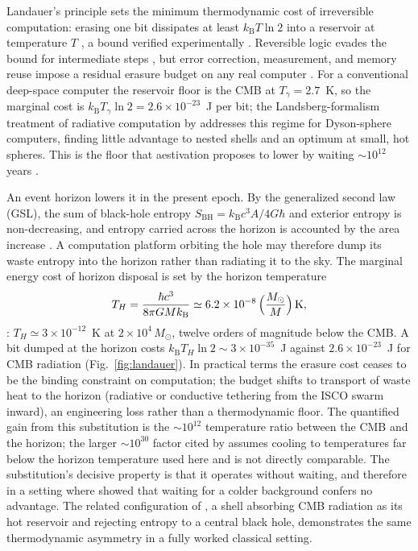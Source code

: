\documentclass[11pt]{article}
\newcommand{\msun}{\ensuremath{M_\odot}}
\newcommand{\kb}{\ensuremath{k_{\mathrm{B}}}}
\begin{document}
Landauer's principle sets the minimum thermodynamic cost of irreversible computation: erasing one bit dissipates at least $\kb T\ln 2$ into a reservoir at temperature $T$ \citep{Landauer1961,Bennett1982,Parrondo2015}, a bound verified experimentally \citep{Berut2012}. Reversible logic evades the bound for intermediate steps \citep{Bennett1973,Toffoli1980,FredkinToffoli1982,Frank2002,Athas1994}, but error correction, measurement, and memory reuse impose a residual erasure budget on any real computer \citep{Wolpert2019}. For a conventional deep-space computer the reservoir floor is the CMB at $T_{\gamma} = 2.7$~K, so the marginal cost is $\kb T_{\gamma}\ln 2 = 2.6\times10^{-23}$~J per bit; the Landsberg-formalism treatment of radiative computation by \citet{Wright2023Landsberg} addresses this regime for Dyson-sphere computers, finding little advantage to nested shells and an optimum at small, hot spheres. This is the floor that aestivation proposes to lower by waiting $\sim$$10^{12}$ years \citep{Sandberg2016}.

An event horizon lowers it in the present epoch. By the generalized second law (GSL), the sum of black-hole entropy $S_{\mathrm{BH}} = \kb c^{3}A/4G\hbar$ and exterior entropy is non-decreasing, and entropy carried across the horizon is accounted by the area increase \citep{Bekenstein1973,Bekenstein1974,Bousso2002}. A computation platform orbiting the hole may therefore dump its waste entropy into the horizon rather than radiating it to the sky. The marginal energy cost of horizon disposal is set by the horizon temperature
\begin{equation}
T_{H} = \frac{\hbar c^{3}}{8\pi G M \kb} \simeq 6.2\times10^{-8}\,\Bigl(\frac{\msun}{M}\Bigr)\,\mathrm{K},
\label{eq:hawking}
\end{equation}
\citep{Hawking1974,Hawking1975}: $T_H \simeq 3\times10^{-12}$~K at $2\times10^{4}\,\msun$, twelve orders of magnitude below the CMB. A bit dumped at the horizon costs $\kb T_H \ln 2 \sim 3\times10^{-35}$~J against $2.6\times10^{-23}$~J for CMB radiation (Fig.~\ref{fig:landauer}). In practical terms the erasure cost ceases to be the binding constraint on computation; the budget shifts to transport of waste heat to the horizon (radiative or conductive tethering from the ISCO swarm inward), an engineering loss rather than a thermodynamic floor. The quantified gain from this substitution is the $\sim 10^{12}$ temperature ratio between the CMB and the horizon; the larger $\sim 10^{30}$ factor cited by \citet{Sandberg2016} assumes cooling to temperatures far below the horizon temperature used here and is not directly comparable. The substitution's decisive property is that it operates without waiting, and therefore in a setting where \citet{Bennett2019} showed that waiting for a colder background confers no advantage. The related configuration of \citet{Opatrny2017}, a shell absorbing CMB radiation as its hot reservoir and rejecting entropy to a central black hole, demonstrates the same thermodynamic asymmetry in a fully worked classical setting.
\end{document}
